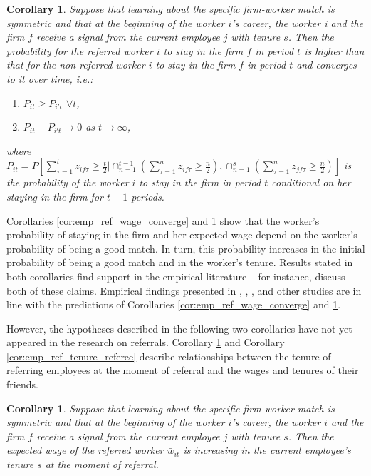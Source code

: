 \documentclass[12pt]{article}
\newtheorem{corollary}[theorem]{Corollary}
\begin{document}
\begin{corollary}\label{cor:emp_ref_tenure_worker}
Suppose that learning about the specific firm-worker match is symmetric and that at the beginning of the worker $i$’s career, the worker i and the firm $f$ receive a signal from the current employee $j$ with tenure $s$. Then the probability for the referred worker $i$ to stay in the firm $f$ in period $t$ is higher than that for the non-referred worker $i$ to stay in the firm $f$ in period $t$ and converges to it over time, i.e.:
\begin{enumerate}[label={\roman*})]
\item $P_{it} \geq P_{i't}$ $\forall t$,
\item $P_{it} - P_{i't} \rightarrow 0$ as $t \rightarrow \infty$,
\end{enumerate}
where $P_{it} = P[\sum_{\tau = 1}^{t} z_{if\tau}\geq \frac{t}{2} \vert \cap_{n=1}^{t-1} (\sum_{\tau = 1}^{n} z_{if\tau}\geq \frac{n}{2}),\cap_{n=1}^{s} (\sum_{\tau = 1}^{n} z_{jf\tau}\geq \frac{n}{2})]$ is the probability of the worker $i$ to stay in the firm in period $t$ conditional on her staying in the firm for $t-1$ periods.
\end{corollary}

Corollaries \ref{cor:emp_ref_wage_converge} and \ref{cor:emp_ref_tenure_worker} show that the worker's probability of staying in the firm and her expected wage depend on the worker's probability of being a good match. In turn, this probability increases in the initial probability of being a good match and in the worker's tenure.  Results stated in both corollaries find support in the empirical literature – for instance, \cite{brown2016informal} discuss both of these claims. Empirical findings presented in \cite{montgomery1991social}, \cite{simon1992matchmaker}, \cite{dustmann2016referral}, and other studies are in line with the predictions of Corollaries \ref{cor:emp_ref_wage_converge} and \ref{cor:emp_ref_tenure_worker}.

However, the hypotheses described in the following two corollaries have not yet appeared in the research on referrals. Corollary \ref{cor:emp_ref_wage_employee} and Corollary \ref{cor:emp_ref_tenure_referee} describe relationships between the tenure of referring employees at the moment of referral and the wages and tenures of their friends.

\begin{corollary}\label{cor:emp_ref_wage_employee}
Suppose that learning about the specific firm-worker match is symmetric and that at the beginning of the worker $i$’s career, the worker $i$ and the firm $f$ receive a signal from the current employee $j$ with tenure $s$. Then the expected wage of the referred worker $\bar{w}_{it}$ is increasing in the current employee's tenure $s$ at the moment of referral.
\end{corollary}
\end{document}
